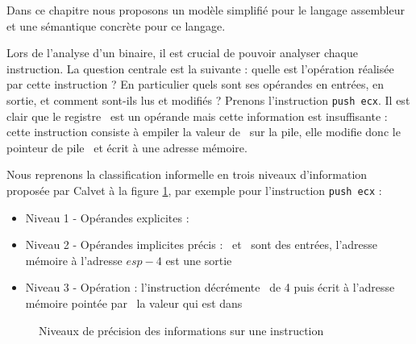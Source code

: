 
Dans ce chapitre nous proposons un modèle simplifié pour le langage assembleur et une sémantique concrète pour ce langage.

Lors de l'analyse d'un binaire, il est crucial de pouvoir analyser chaque instruction.
La question centrale est la suivante : quelle est l'opération réalisée par cette instruction ?
En particulier quels sont ses opérandes en entrées, en sortie, et comment sont-ils lus et modifiés ?
Prenons l'instruction \texttt{push ecx}. 
Il est clair que le registre \ecx\ est un opérande mais cette information est insuffisante : cette instruction consiste à empiler la valeur de \ecx\ sur la pile, elle modifie donc le pointeur de pile \esp\ et écrit à une adresse mémoire.

Nous reprenons la classification informelle en trois niveaux d'information proposée par Calvet \cite{Calvet2013} à la figure \ref{fig:niveaux_sem}, par exemple pour l'instruction \texttt{push ecx} :
\begin{itemize}
 \item Niveau 1 - Opérandes explicites : \ecx
 \item Niveau 2 - Opérandes implicites précis : \ecx\ et \esp\ sont des entrées, l'adresse mémoire à l'adresse $esp-4$ est une sortie
 \item Niveau 3 - Opération : l'instruction décrémente \esp\ de 4 puis écrit à l'adresse mémoire pointée par \esp\ la valeur qui est dans \ecx
\end{itemize}

\begin{figure}
\begin{center}
\end{center}
\caption{Niveaux de précision des informations sur une instruction}
\label{fig:niveaux_sem}
\end{figure}

